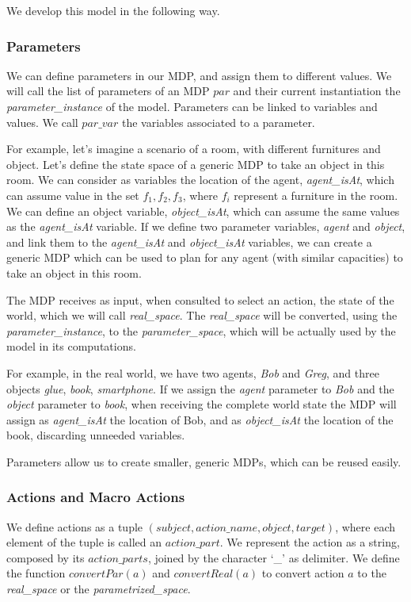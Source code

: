  We develop this model in the following way.

\subsubsection{Parameters}
We can define parameters in our MDP, and assign them to different values. We will call the list of parameters of an MDP $par$ and their current instantiation the \textit{parameter\_instance} of the model. Parameters can be linked to variables and values. We call $par\_var$ the variables associated to a parameter. 

For example, let's imagine a scenario of a room, with different furnitures and object. Let's define the state space of a generic MDP to take an object in this room. We can consider as variables the location of the agent, \textit{agent\_isAt}, which can assume value in the set ${f_1, f_2, f_3}$, where $f_i$ represent a furniture in the room. We can define an object variable, \textit{object\_isAt}, which can assume the same values as the \textit{agent\_isAt} variable. If we define two parameter variables, \textit{agent} and \textit{object}, and link them to the \textit{agent\_isAt} and \textit{object\_isAt} variables, we can create a generic MDP which can be used to plan for any agent (with similar capacities) to take an object in this room.

The MDP receives as input, when consulted to select an action, the state of the world,  which we will call \textit{real\_space}. The \textit{real\_space} will be converted, using the \textit{parameter\_instance}, to the \textit{parameter\_space}, which will be actually used by the model in its computations. 

For example, in the real world, we have two agents, \textit{Bob} and \textit{Greg}, and three objects \textit{glue}, \textit{book}, \textit{smartphone}. If we assign the \textit{agent} parameter to \textit{Bob} and the \textit{object} parameter to \textit{book}, when receiving the complete world state the MDP will assign as \textit{agent\_isAt} the location of Bob, and as \textit{object\_isAt} the location of the book, discarding unneeded variables.

Parameters allow us to create smaller, generic MDPs, which can be reused easily.


\subsubsection{Actions and Macro Actions}
We define actions as a tuple $(subject,action\_name,object,target)$, where each element of the tuple is called an $action\_part$.  We represent the action as a string, composed by its $action\_parts$, joined by the character `\_' as delimiter. We define the function $convertPar(a)$ and $convertReal(a)$ to convert action $a$ to the \textit{real\_space} or the \textit{parametrized\_space}.

